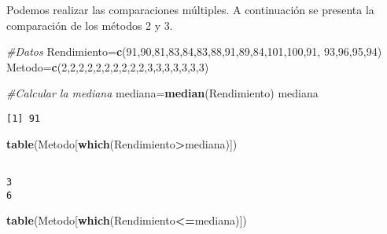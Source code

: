 \documentclass[a4paper,oneside,openany]{book}
\newenvironment{Shaded}{\begin{snugshade}}{\end{snugshade}}
\newcommand{\KeywordTok}[1]{\textcolor[rgb]{0.13,0.29,0.53}{\textbf{#1}}}
\newcommand{\DecValTok}[1]{\textcolor[rgb]{0.00,0.00,0.81}{#1}}
\newcommand{\CommentTok}[1]{\textcolor[rgb]{0.56,0.35,0.01}{\textit{#1}}}
\newcommand{\OperatorTok}[1]{\textcolor[rgb]{0.81,0.36,0.00}{\textbf{#1}}}
\newcommand{\NormalTok}[1]{#1}
\begin{document}
Podemos realizar las comparaciones múltiples. A continuación se presenta
la comparación de los métodos 2 y 3.

\begin{Shaded}
\begin{Highlighting}[]
\CommentTok{#Datos}
\NormalTok{Rendimiento=}\KeywordTok{c}\NormalTok{(}\DecValTok{91}\NormalTok{,}\DecValTok{90}\NormalTok{,}\DecValTok{81}\NormalTok{,}\DecValTok{83}\NormalTok{,}\DecValTok{84}\NormalTok{,}\DecValTok{83}\NormalTok{,}\DecValTok{88}\NormalTok{,}\DecValTok{91}\NormalTok{,}\DecValTok{89}\NormalTok{,}\DecValTok{84}\NormalTok{,}\DecValTok{101}\NormalTok{,}\DecValTok{100}\NormalTok{,}\DecValTok{91}\NormalTok{,}
              \DecValTok{93}\NormalTok{,}\DecValTok{96}\NormalTok{,}\DecValTok{95}\NormalTok{,}\DecValTok{94}\NormalTok{)}
\NormalTok{Metodo=}\KeywordTok{c}\NormalTok{(}\DecValTok{2}\NormalTok{,}\DecValTok{2}\NormalTok{,}\DecValTok{2}\NormalTok{,}\DecValTok{2}\NormalTok{,}\DecValTok{2}\NormalTok{,}\DecValTok{2}\NormalTok{,}\DecValTok{2}\NormalTok{,}\DecValTok{2}\NormalTok{,}\DecValTok{2}\NormalTok{,}\DecValTok{2}\NormalTok{,}\DecValTok{3}\NormalTok{,}\DecValTok{3}\NormalTok{,}\DecValTok{3}\NormalTok{,}\DecValTok{3}\NormalTok{,}\DecValTok{3}\NormalTok{,}\DecValTok{3}\NormalTok{,}\DecValTok{3}\NormalTok{)}

\CommentTok{#Calcular la mediana}
\NormalTok{mediana=}\KeywordTok{median}\NormalTok{(Rendimiento)}
\NormalTok{mediana}
\end{Highlighting}
\end{Shaded}

\begin{verbatim}
[1] 91
\end{verbatim}

\begin{Shaded}
\begin{Highlighting}[]
\KeywordTok{table}\NormalTok{(Metodo[}\KeywordTok{which}\NormalTok{(Rendimiento}\OperatorTok{>}\NormalTok{mediana)])}
\end{Highlighting}
\end{Shaded}

\begin{verbatim}

3 
6 
\end{verbatim}

\begin{Shaded}
\begin{Highlighting}[]
\KeywordTok{table}\NormalTok{(Metodo[}\KeywordTok{which}\NormalTok{(Rendimiento}\OperatorTok{<=}\NormalTok{mediana)])}
\end{Highlighting}
\end{Shaded}
\end{document}
